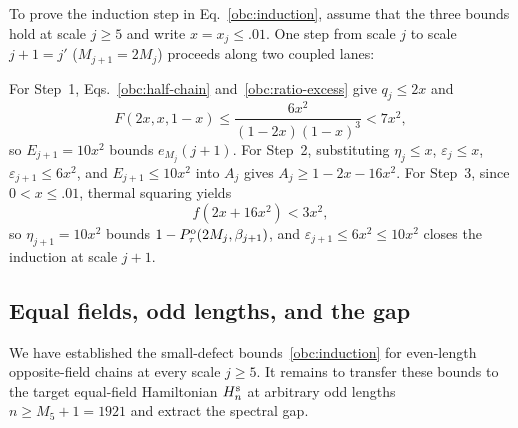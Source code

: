 To prove the induction step in Eq.~\eqref{obc:induction}, assume that
the three bounds hold at scale $j\ge5$ and write $x=x_j\le.01$. One
step from scale $j$ to scale $j+1=j'$ ($M_{j+1}=2M_j$) proceeds along
two coupled lanes:
\begin{proofdiagram}
\begin{prooflanes}
\end{prooflanes}
\end{proofdiagram}
For Step~1, Eqs.~\eqref{obc:half-chain} and~\eqref{obc:ratio-excess}
give $q_j\le2x$ and
\begin{equation}
 F(2x,x,1-x)
 \le\frac{6x^2}{(1-2x)(1-x)^3}<7x^2,
 \label{obc:boundary-step}
\end{equation}
so $E_{j+1}=10x^2$ bounds $e_{M_j}(j+1)$. For Step~2, substituting
$\eta_j\le x$, $\varepsilon_j\le x$, $\varepsilon_{j+1}\le6x^2$, and
$E_{j+1}\le10x^2$ into $A_j$ gives $A_j\ge1-2x-16x^2$. For Step~3,
since $0<x\le.01$, thermal squaring yields
\begin{equation}
 f(2x+16x^2)<3x^2,
 \label{obc:thermal-step}
\end{equation}
so $\eta_{j+1}=10x^2$ bounds $1-P_{\tau}^{\mathrm{o}}(2M_j,\beta_{j+1})$, and
$\varepsilon_{j+1}\le6x^2\le10x^2$ closes the induction at scale $j+1$.

\subsection{Equal fields, odd lengths, and the gap}
\label{obc:comparison}

We have established the small-defect bounds~\eqref{obc:induction} for even-length opposite-field chains at every scale $j\ge5$.
It remains to transfer these bounds to the target equal-field Hamiltonian $H_n^{\mathrm{s}}$ at arbitrary odd lengths $n\ge M_5+1=1921$ and extract the spectral gap.

